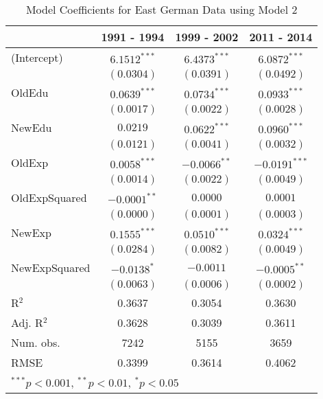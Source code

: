 
\begin{table}
\begin{center}
\begin{tiny}
\begin{tabular}{l c c c }
\hline
 & 1991 - 1994 & 1999 - 2002 & 2011 - 2014 \\
\hline
(Intercept)   & $6.1512^{***}$ & $6.4373^{***}$ & $6.0872^{***}$  \\
              & $(0.0304)$     & $(0.0391)$     & $(0.0492)$      \\
OldEdu        & $0.0639^{***}$ & $0.0734^{***}$ & $0.0933^{***}$  \\
              & $(0.0017)$     & $(0.0022)$     & $(0.0028)$      \\
NewEdu        & $0.0219$       & $0.0622^{***}$ & $0.0960^{***}$  \\
              & $(0.0121)$     & $(0.0041)$     & $(0.0032)$      \\
OldExp        & $0.0058^{***}$ & $-0.0066^{**}$ & $-0.0191^{***}$ \\
              & $(0.0014)$     & $(0.0022)$     & $(0.0049)$      \\
OldExpSquared & $-0.0001^{**}$ & $0.0000$       & $0.0001$        \\
              & $(0.0000)$     & $(0.0001)$     & $(0.0003)$      \\
NewExp        & $0.1555^{***}$ & $0.0510^{***}$ & $0.0324^{***}$  \\
              & $(0.0284)$     & $(0.0082)$     & $(0.0049)$      \\
NewExpSquared & $-0.0138^{*}$  & $-0.0011$      & $-0.0005^{**}$  \\
              & $(0.0063)$     & $(0.0006)$     & $(0.0002)$      \\
\hline
R$^2$         & 0.3637         & 0.3054         & 0.3630          \\
Adj. R$^2$    & 0.3628         & 0.3039         & 0.3611          \\
Num. obs.     & 7242           & 5155           & 3659            \\
RMSE          & 0.3399         & 0.3614         & 0.4062          \\
\hline
\multicolumn{4}{l}{\tiny{$^{***}p<0.001$, $^{**}p<0.01$, $^*p<0.05$}}
\end{tabular}
\end{tiny}
\caption{Model Coefficients for East German Data using Model 2}
\label{table:EastModelsOldNew}
\end{center}
\end{table}

